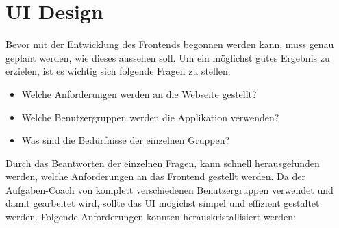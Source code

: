 \section{UI Design}
Bevor mit der Entwicklung des Frontends begonnen werden kann, muss genau geplant werden, wie dieses aussehen soll. Um ein möglichst gutes Ergebnis zu erzielen, ist es wichtig sich folgende Fragen zu stellen:

\begin{itemize}
	\item Welche Anforderungen werden an die Webseite gestellt?
	\item Welche Benutzergruppen werden die Applikation verwenden?
	\item Was sind die Bedürfnisse der einzelnen Gruppen?
\end{itemize}

Durch das Beantworten der einzelnen Fragen, kann schnell herausgefunden werden, welche Anforderungen an das Frontend gestellt werden. Da der Aufgaben-Coach von komplett verschiedenen Benutzergruppen verwendet und damit gearbeitet wird, sollte das UI mögichst simpel und effizient gestaltet werden. Folgende Anforderungen konnten herauskristallisiert werden:

